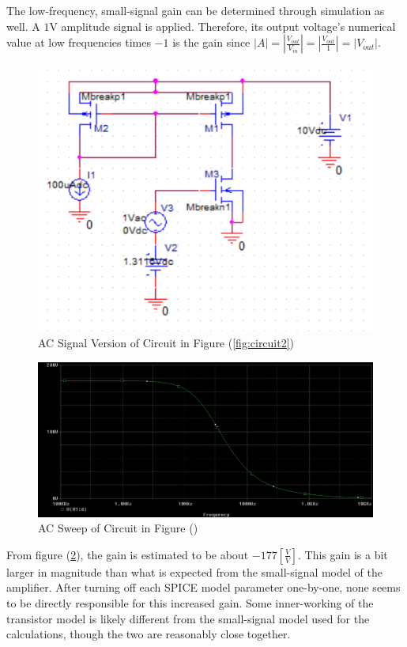The low-frequency, small-signal gain can be determined through simulation as well. A $1$\si{\volt} amplitude signal is applied. Therefore, its output voltage's numerical value at low frequencies times $-1$ is the gain since $|A| = |\frac{V_{out}}{V_{in}}| = |\frac{V_{out}}{1}| = |V_{out}|$.

\FloatBarrier

\begin{figure}[h!]
	\centering
	\includegraphics[scale=0.75]{../images/circuit3.PNG}
	\caption{AC Signal Version of Circuit in Figure (\ref{fig:circuit2})}
	\label{fig:circuit3}
\end{figure}

\FloatBarrier

\FloatBarrier

\begin{figure}[h!]
	\centering
	\includegraphics[scale=0.75]{../images/circuit3_ac_sweep.PNG}
	\caption{AC Sweep of Circuit in Figure ()}
	\label{fig:circuit3_ac_sweep}
\end{figure}

\FloatBarrier

From figure (\ref{fig:circuit3_ac_sweep}), the gain is estimated to be about $-177[\frac{V}{V}]$. This gain is a bit larger in magnitude than what is expected from the small-signal model of the amplifier. After turning off each SPICE model parameter one-by-one, none seems to be directly responsible for this increased gain. Some inner-working of the transistor model is likely different from the small-signal model used for the calculations, though the two are reasonably close together.
